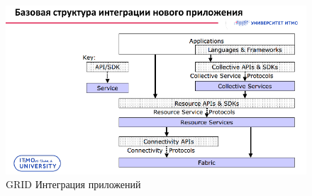 \begin{figure}[h]
	\centering
	\begin{minipage}[b]{0.7\textwidth}
		\includegraphics[width=\textwidth]{images/integr.png}
		\caption{GRID Интеграция приложений}
	\end{minipage}
\end{figure}